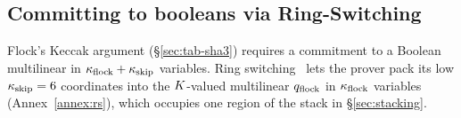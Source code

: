 \subsection{Committing to booleans via Ring-Switching}\label{sec:ringswitch}

Flock's Keccak argument (\S\ref{sec:tab-sha3}) requires a commitment to a Boolean multilinear in $\kappa_{\mathrm{flock}}+\kappa_{\mathrm{skip}}$ variables. Ring switching~\cite{DP24} lets the prover pack its low $\kappa_{\mathrm{skip}}=6$ coordinates into the $K$-valued multilinear $q_{\mathrm{flock}}$ in $\kappa_{\mathrm{flock}}$ variables (Annex~\ref{annex:rs}), which occupies one region of the stack in \S\ref{sec:stacking}.
